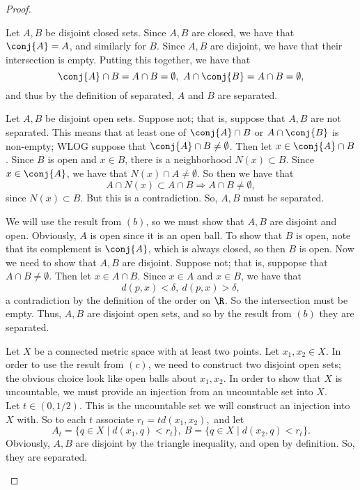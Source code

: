 \documentclass{assignment}
\begin{document}
\begin{proof}\leavevmode
  \begin{qparts}
    \item Let $A, B$ be disjoint closed sets. Since $A, B$ are closed, we have that $\conj{A} = A$, and 
     similarly for $B$. Since $A, B$ are disjoint, we have that their intersection is empty. Putting this
     together, we have that $$\conj{A} \cap B =  A \cap B = \emptyset,\ A \cap \conj{B} = A \cap B = \emptyset,$$
     and thus by the definition of separated, $A$ and $B$ are separated.

    \item Let $A,B$ be disjoint open sets. Suppose not; that is, suppose that $A,B$ are not separated.
    This means that at least one of $\conj{A} \cap B$ or $A \cap \conj{B}$ is non-empty; WLOG suppose
    that $\conj{A} \cap B \neq \emptyset$. Then let $x\in \conj{A} \cap B$. Since $B$ is open and 
    $x\in B$, there is a neighborhood $N(x) \subset B$. Since $x\in\conj{A}$, we have that $N(x) \cap
    A \neq \emptyset$. So then we have that $$A \cap N(x) \subset A \cap B \Rightarrow A \cap B \neq 
    \emptyset,$$ since $N(x)\subset B$. But this is a contradiction. So, $A,B$ must be separated.

    \item We will use the result from $(b)$, so we must show that $A,B$ are disjoint and open. Obviously,
    $A$ is open since it is an open ball. To show that $B$ is open, note that its complement is 
    $\conj{A}$, which is always closed, so then $B$ is open. Now we need to show that $A,B$ are disjoint.
    Suppose not; that is, suppopse that $A\cap B \neq \emptyset$. Then let $x\in A\cap B$. Since $x\in A$
    and $x\in B$, we have that $$d(p, x) < \delta,\ d(p,x) > \delta,$$ a contradiction by the definition
    of the order on $\R$. So the intersection must be empty. Thus, $A,B$ are disjoint open sets, and
    so by the result from $(b)$ they are separated.

    \item Let $X$ be a connected metric space with at least two points. Let $x_1, x_2 \in X$. In order
    to use the result from $(c)$, we need to construct two disjoint open sets; the obvious choice
    look like open balls about $x_1, x_2$. In order to show that $X$ is uncountable, we must provide
    an injection from an uncountable set into $X$. \\

    Let $t\in (0, 1/2)$. This is the uncountable set we will construct an injection into $X$ with.
    So to each $t$ associate $r_t = t d(x_1, x_2),$ and let $$A_t = \{q\in X\mid d(x_1, q) < r_t \},
    \ B = \{q\in X\mid d(x_2, q) < r_t\}.$$ Obviously, $A,B$ are disjoint by the triangle inequality, 
    and open by definition. So, they are separated. \\


\end{qparts}
\end{proof}
\end{document}
